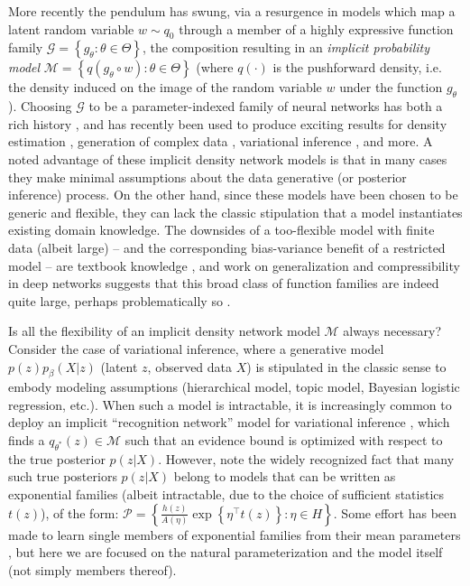 \documentclass{article}
\begin{document}
More recently the pendulum has swung, via a resurgence in models which map a latent random variable $w\sim q_0$ through a member of a highly expressive function family $\mathcal{G} = \left\{g_\theta : \theta \in \Theta\right\}$, the composition resulting in an \emph{implicit probability model} $\mathcal{M} = \left\{ q(g_\theta \circ w) : \theta \in \Theta \right\}$ (where $q(\cdot)$ is the pushforward density, i.e. the density induced on the image of the random variable $w$ under the function $g_\theta$).  
Choosing $\mathcal{G}$ to be a parameter-indexed family of neural networks has both a rich history \cite{dayan1995helmholtz,mackay1997density}, and has recently been used to produce exciting results for density estimation \cite{uria2013rnade, rippel2013high, papamakarios2017masked}, generation of complex data \cite{Goodfellow:2014aa}, variational inference \cite{Kingma:2013aa, rezende2014stochastic, titsias2014doubly}, and more.  
A noted advantage of these implicit density network models is that in many cases they make minimal assumptions about the data generative (or posterior inference) process.  
On the other hand, since these models have been chosen to be generic and flexible, they can lack the classic stipulation that a model instantiates existing domain knowledge.  
The downsides of a too-flexible model with finite data (albeit large) -- and the corresponding bias-variance benefit of a restricted model -- are textbook knowledge \cite[\S 7.3]{friedman2001elements}, and work on generalization and compressibility in deep networks suggests that this broad class of function families are indeed quite large, perhaps problematically so \cite{zhou2018compressibility}.  

Is all the flexibility of an implicit density network model $\mathcal{M}$ always necessary?  
Consider the case of variational inference, where a generative model $p(z)p_\beta(X | z)$ (latent $z$, observed data $X$) is stipulated in the classic sense to embody modeling assumptions (hierarchical model, topic model, Bayesian logistic regression, etc.).  
When such a model is intractable, it is increasingly common to deploy an implicit ``recognition network'' model for variational inference \cite{Kingma:2013aa}, which finds a $q_{\theta^*}(z) \in \mathcal{M}$ such that an evidence bound is optimized with respect to the true posterior $p(z|X)$.  
However, note the widely recognized fact \cite{wainwright2008graphical} that many such true posteriors $p(z|X)$ belong to models that can be written as exponential families (albeit intractable, due to the choice of sufficient statistics $t(z)$), of the form: $\mathcal{P} = \left\{ \frac{h(z)}{A(\eta)} \exp\left\{ \eta^\top t(z) \right \} : \eta \in H \right\}$.  Some effort has been made to learn single members of exponential families from their mean parameters \cite{loaiza2017maximum}, but here we are focused on the natural parameterization and the model itself (not simply members thereof). 
\end{document}
